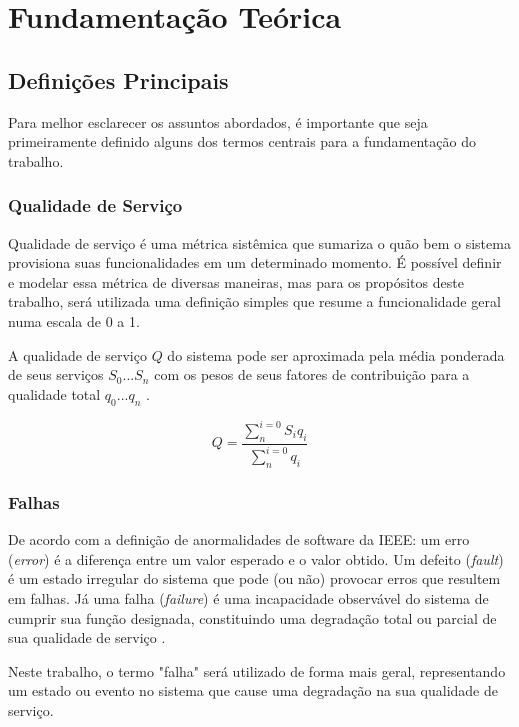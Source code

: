 \chapter{Fundamentação Teórica}
\label{cap:fund}

\section{Definições Principais}

Para melhor esclarecer os assuntos abordados, é importante que seja primeiramente definido alguns dos termos centrais para a fundamentação do trabalho.

\subsection{Qualidade de Serviço}

Qualidade de serviço é uma métrica sistêmica que sumariza o quão bem o sistema provisiona suas funcionalidades em um determinado momento. É possível definir e modelar essa métrica de diversas maneiras, mas para os propósitos deste trabalho, será utilizada uma definição simples que resume a funcionalidade geral numa escala de 0 a 1.

A qualidade de serviço $Q$ do sistema pode ser aproximada pela média ponderada de seus serviços $S_0 ... S_n$ com os pesos de seus fatores de contribuição para a qualidade total $q_0 ... q_n$ \cite{SchedAndOptOfDistributedFT}.

\begin{equation}
    Q = \frac{ \sum^{i = 0}_{n} S_i q_i }{ \sum^{i = 0}_{n} q_i}
\end{equation}

\subsection{Falhas}

De acordo com a definição de anormalidades de software da IEEE: um erro (\textit{error}) é a diferença entre um valor esperado e o valor obtido. Um defeito (\textit{fault}) é um estado irregular do sistema que pode (ou não) provocar erros que resultem em falhas. Já uma falha (\textit{failure}) é uma incapacidade observável do sistema de cumprir sua função designada, constituindo uma degradação total ou parcial de sua qualidade de serviço \cite{IEEEAnormalities}.

Neste trabalho, o termo "falha" será utilizado de forma mais geral, representando um estado ou evento no sistema que cause uma degradação na sua qualidade de serviço.

